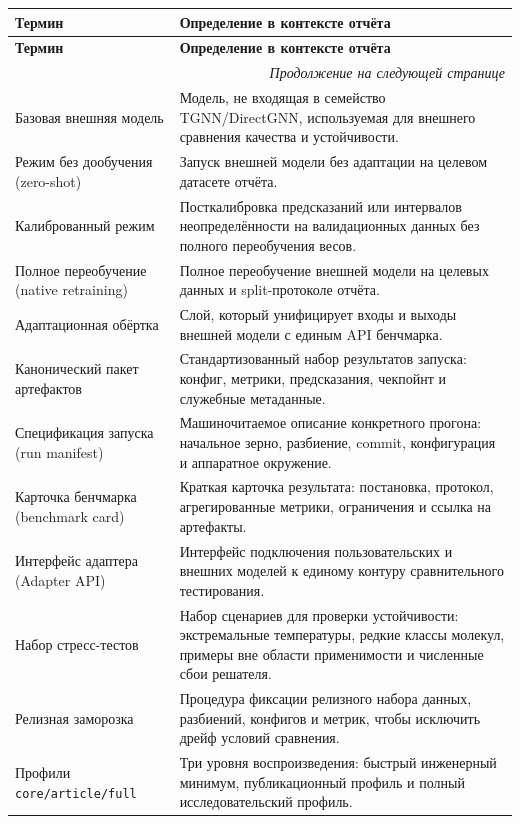 \documentclass[11pt]{article}
\begin{document}
\begin{center}
\small
\begin{longtable}{|p{}|p{}|}
\hline
\textbf{Термин} & \textbf{Определение в контексте отчёта} \\
\hline
\endfirsthead
\hline
\textbf{Термин} & \textbf{Определение в контексте отчёта} \\
\hline
\endhead
\hline
\multicolumn{2}{r}{\textit{Продолжение на следующей странице}} \\
\hline
\endfoot
\hline
\endlastfoot
Базовая внешняя модель & Модель, не входящая в семейство TGNN/DirectGNN, используемая для внешнего сравнения качества и устойчивости. \\
\hline
Режим без дообучения (zero-shot) & Запуск внешней модели без адаптации на целевом датасете отчёта. \\
\hline
Калиброванный режим & Посткалибровка предсказаний или интервалов неопределённости на валидационных данных без полного переобучения весов. \\
\hline
Полное переобучение (native retraining) & Полное переобучение внешней модели на целевых данных и split-протоколе отчёта. \\
\hline
Адаптационная обёртка & Слой, который унифицирует входы и выходы внешней модели с единым API бенчмарка. \\
\hline
Канонический пакет артефактов & Стандартизованный набор результатов запуска: конфиг, метрики, предсказания, чекпойнт и служебные метаданные. \\
\hline
Спецификация запуска (run manifest) & Машиночитаемое описание конкретного прогона: начальное зерно, разбиение, commit, конфигурация и аппаратное окружение. \\
\hline
Карточка бенчмарка (benchmark card) & Краткая карточка результата: постановка, протокол, агрегированные метрики, ограничения и ссылка на артефакты. \\
\hline
Интерфейс адаптера (Adapter API) & Интерфейс подключения пользовательских и внешних моделей к единому контуру сравнительного тестирования. \\
\hline
Набор стресс-тестов & Набор сценариев для проверки устойчивости: экстремальные температуры, редкие классы молекул, примеры вне области применимости и численные сбои решателя. \\
\hline
Релизная заморозка & Процедура фиксации релизного набора данных, разбиений, конфигов и метрик, чтобы исключить дрейф условий сравнения. \\
\hline
Профили \texttt{core/article/full} & Три уровня воспроизведения: быстрый инженерный минимум, публикационный профиль и полный исследовательский профиль. \\
\hline
\end{longtable}
\normalsize
\end{center}
\end{document}
